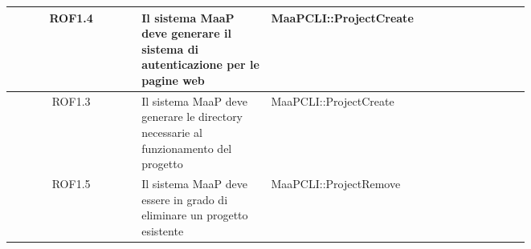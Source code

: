 \begin{center}
\begin{longtable}{|c|p{0.25\linewidth}|p{0.5\linewidth}|}
\midrule
ROF1.4
& Il sistema MaaP deve generare il sistema di autenticazione per le pagine web
& MaaPCLI::ProjectCreate\\

\midrule
ROF1.3
& Il sistema MaaP deve generare le directory necessarie al funzionamento del progetto
& MaaPCLI::ProjectCreate\\

\midrule
ROF1.5
& Il sistema MaaP deve essere in grado di eliminare un progetto esistente
& MaaPCLI::ProjectRemove\\

\end{longtable}
\end{center}


